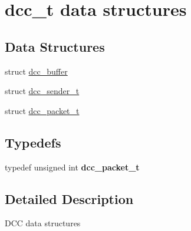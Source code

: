 \hypertarget{group__dcc__t__structs}{\section{dcc\-\_\-t data structures}
\label{group__dcc__t__structs}
}
\subsection*{Data Structures}
\begin{DoxyCompactItemize}
\item 
struct \hyperlink{structdcc__buffer}{dcc\-\_\-buffer}
\item 
struct \hyperlink{structdcc__sender__t}{dcc\-\_\-sender\-\_\-t}
\item 
struct \hyperlink{structdcc__packet__t}{dcc\-\_\-packet\-\_\-t}
\end{DoxyCompactItemize}
\subsection*{Typedefs}
\begin{DoxyCompactItemize}
\item 
\hypertarget{group__dcc__t__structs_ga8b23789145a099407c1361ddb8bfe11b}{typedef unsigned int {\bfseries dcc\-\_\-packet\-\_\-t}}\label{group__dcc__t__structs_ga8b23789145a099407c1361ddb8bfe11b}

\end{DoxyCompactItemize}


\subsection{Detailed Description}
D\-C\-C data structures 